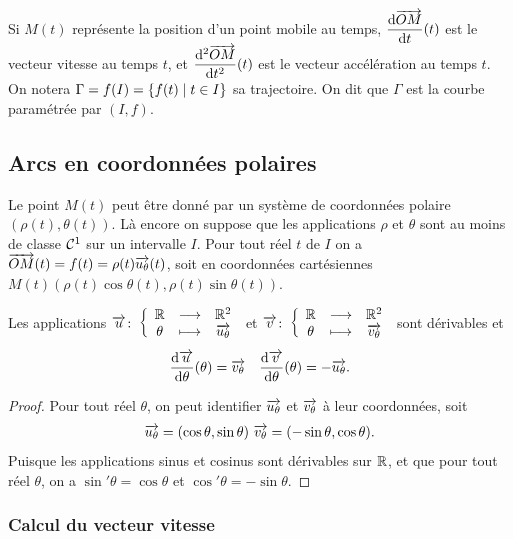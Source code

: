 Si \(M(t)\) représente la position d'un point mobile au temps,
\(\dfrac{\mathrm{d} \overrightarrow{OM}}{\mathrm{d} t}(t)\) est le vecteur vitesse au temps \(t\), et
\(\dfrac{\mathrm{d}^2 \overrightarrow{OM}}{\mathrm{d} {t}^2}(t)\) est le vecteur accélération au temps \(t\). On
notera \(\Gamma = f(I) =\left\{f(t)\mathrel{}\middle|\mathrel{}t \in I\right\}\) sa trajectoire. On dit que
\(\Gamma\) est la courbe paramétrée par \((I, f)\).

\subsection{Arcs en coordonnées polaires}

Le point \(M(t)\) peut être donné par un système de coordonnées polaire
\((\rho(t), \theta(t))\). Là encore on suppose que les applications \(\rho\) et
\(\theta\) sont au moins de classe \(\mathcal{C}^{1}\) sur un intervalle \(I\). Pour
tout réel \(t\) de \(I\) on a \(\overrightarrow{OM}(t) = f(t) =
\rho(t)\overrightarrow{u_\theta}(t)\), soit en coordonnées cartésiennes
\(M(t)(\rho(t)\cos\theta(t), \rho(t)\sin\theta(t))\).

\begin{prop}
  Les applications \(\overrightarrow{u}\colon\left\{\begin{array}{ccc}\mathbb{R} & \longrightarrow &\mathbb{R}^2\\\theta & \longmapsto & \overrightarrow{u_\theta}\end{array}\right.\) et
  \(\overrightarrow{v}\colon\left\{\begin{array}{ccc}\mathbb{R} & \longrightarrow &\mathbb{R}^2\\\theta & \longmapsto & \overrightarrow{v_\theta}\end{array}\right.\) sont dérivables et
  \begin{equation}
    \dfrac{\mathrm{d} \overrightarrow{u}}{\mathrm{d} \theta}(\theta) = \overrightarrow{v_\theta} \quad
    \dfrac{\mathrm{d} \overrightarrow{v}}{\mathrm{d} \theta}(\theta) = -\overrightarrow{u_\theta}.
  \end{equation}
\end{prop}

\begin{proof}
  Pour tout réel \(\theta\), on peut identifier \(\overrightarrow{u_\theta}\) et
  \(\overrightarrow{v_\theta}\) à leur coordonnées, soit
  \begin{equation}
    \overrightarrow{u_\theta} = (\cos \theta, \sin \theta) \ \overrightarrow{v_{\theta}} = (-\sin
    \theta, \cos \theta).
  \end{equation}
  Puisque les applications sinus et cosinus sont dérivables sur \(\mathbb{R}\), et que
  pour tout réel \(\theta\), on a \(\sin' \theta = \cos \theta\) et \(\cos'
  \theta = -\sin \theta\).
\end{proof}

\subsubsection{Calcul du vecteur vitesse}

